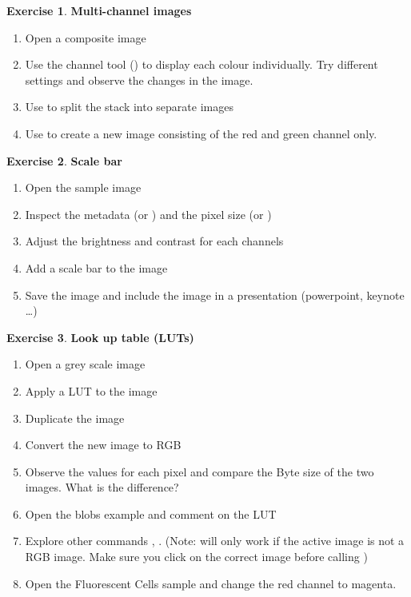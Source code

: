 \documentclass[xcolor=table,DIV=19,twocolumn,10pt]{scrartcl}
\theoremstyle{definition}
\newtheorem{exercice}{Exercise}
\begin{document}
\begin{exercice} \textbf{Multi-channel images}
  \begin{enumerate}
  \item Open a composite image 
  \item Use the channel tool () to display each colour individually. Try different settings and observe the changes in the image.
  \item Use  to split the stack into separate images
  \item Use  to create a new image consisting of the red and green channel only.
  \end{enumerate}
\end{exercice}

\begin{exercice} \textbf{Scale bar}
  \begin{enumerate}
  \item Open the sample image 
  \item Inspect the metadata  (or ) and the pixel size  (or )
  \item Adjust the brightness and contrast for each channels
  \item Add a scale bar to the image
  \item Save the image and include the image in a presentation (powerpoint, keynote \dots)
  \end{enumerate}
\end{exercice}


\begin{exercice} \textbf{Look up table (LUTs)}
  \begin{enumerate}
  \item Open a grey scale image 
  \item Apply a LUT to the image 
  \item Duplicate the image 
  \item Convert the new image to RGB 
  \item Observe the values for each pixel and compare the Byte size of the two images. What is the difference?
  \item Open the blobs example  and
    comment on the LUT
  \item Explore other commands ,
    . (Note:  will only work if the active image  is not a RGB image. Make sure you click on the correct image before calling )
  \item Open the Fluorescent Cells sample and change the red channel
    to magenta.
  \end{enumerate}
\end{exercice}
\end{document}

